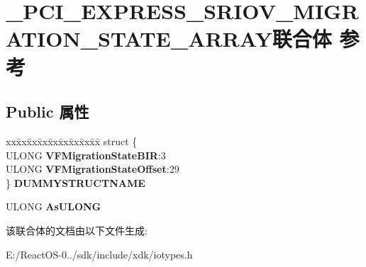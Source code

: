 \hypertarget{union___p_c_i___e_x_p_r_e_s_s___s_r_i_o_v___m_i_g_r_a_t_i_o_n___s_t_a_t_e___a_r_r_a_y}{}\section{\+\_\+\+P\+C\+I\+\_\+\+E\+X\+P\+R\+E\+S\+S\+\_\+\+S\+R\+I\+O\+V\+\_\+\+M\+I\+G\+R\+A\+T\+I\+O\+N\+\_\+\+S\+T\+A\+T\+E\+\_\+\+A\+R\+R\+A\+Y联合体 参考}
\label{union___p_c_i___e_x_p_r_e_s_s___s_r_i_o_v___m_i_g_r_a_t_i_o_n___s_t_a_t_e___a_r_r_a_y}
\subsection*{Public 属性}
\begin{DoxyCompactItemize}
\item 
\mbox{\label{union___p_c_i___e_x_p_r_e_s_s___s_r_i_o_v___m_i_g_r_a_t_i_o_n___s_t_a_t_e___a_r_r_a_y_aa1a7e0e80a7e49394a6d08c1d8a9e886}} 
\begin{tabbing}
xx\=xx\=xx\=xx\=xx\=xx\=xx\=xx\=xx\=\kill
struct \{\\
\>ULONG {\bfseries VFMigrationStateBIR}:3\\
\>ULONG {\bfseries VFMigrationStateOffset}:29\\
\} {\bfseries DUMMYSTRUCTNAME}\\

\end{tabbing}\item 
\mbox{\label{union___p_c_i___e_x_p_r_e_s_s___s_r_i_o_v___m_i_g_r_a_t_i_o_n___s_t_a_t_e___a_r_r_a_y_aade5c3a517ae84f1845be9495039dff8}} 
U\+L\+O\+NG {\bfseries As\+U\+L\+O\+NG}
\end{DoxyCompactItemize}


该联合体的文档由以下文件生成\+:\begin{DoxyCompactItemize}
\item 
E\+:/\+React\+O\+S-\/0../sdk/include/xdk/iotypes.\+h\end{DoxyCompactItemize}
